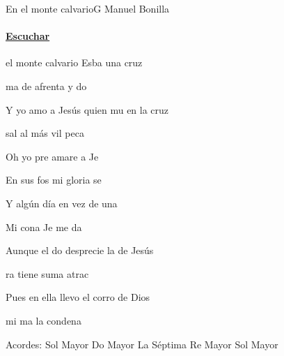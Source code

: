 \documentclass[12pt, spanish]{book}
\begin{document}
    \begin{song}{En el monte calvario}{G}
    {} %
    {Manuel Bonilla}
    {} %
    {}
        \ifChordBk
            \paragraph{\mbox{}\hfill\protect\href{https://open.spotify.com/intl-es/track/02phGrhU7mmWjtPaOKLHN6}{Escuchar}\mbox{}\hfill}
        \fi

        \begin{SBOpGroup}
             el monte calvario Esba una cruz

            ma de afrenta y do

            Y yo amo a Jesús quien mu en la cruz

             sal al más vil peca
        \end{SBOpGroup}

        \begin{SBChorus}
            Oh yo pre amare a Je

            En sus fos mi gloria se

            Y algún día en vez de una 

            Mi cona Je me da
        \end{SBChorus}

        \begin{SBOpGroup}
            Aunque el do desprecie la  de Jesús

            ra  tiene suma atrac

            Pues en ella llevo el corro de Dios

             mi ma la condena
        \end{SBOpGroup}

        \ifChordBk
        \begin{SBOpGroup}
            Acordes:\break
            \upchord{\G}\qquad Sol Mayor \hfill
            \upchord{\C}\qquad Do Mayor \hfill\null\break
            \upchord{\Aseven}\qquad La S\'eptima \hfill
            \upchord{\D}\qquad Re Mayor \hfill
            \upchord{\G}Sol Mayor\hfill\null\break
        \end{SBOpGroup}
        \fi
        \begin{SBExtraKeys}{

}
\end{SBExtraKeys}
\end{song}
\end{document}
